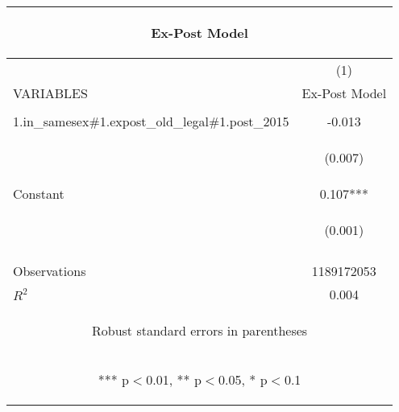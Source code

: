 \documentclass[]{article}
\begin{document}
\begin{center}
\begin{tabular}{lc}
\multicolumn{2}{c}{\begin{large}Ex-Post Model\end{large}} \\ \hline
 & (1) \\
VARIABLES & Ex-Post Model \\ \hline
\vspace{4pt} & \begin{footnotesize}\end{footnotesize} \\
1.in\_samesex\#1.expost\_old\_legal\#1.post\_2015 & -0.013 \\
\vspace{4pt} & \begin{footnotesize}(0.007)\end{footnotesize} \\
Constant & 0.107*** \\
 & \begin{footnotesize}(0.001)\end{footnotesize} \\
\vspace{4pt} & \begin{footnotesize}\end{footnotesize} \\
Observations & 1189172053 \\
 $R^2$ & 0.004 \\ \hline
\multicolumn{2}{c}{\begin{footnotesize} Robust standard errors in parentheses\end{footnotesize}} \\
\multicolumn{2}{c}{\begin{footnotesize} *** p$<$0.01, ** p$<$0.05, * p$<$0.1\end{footnotesize}} \\
\end{tabular}
\end{center}
\end{document}
